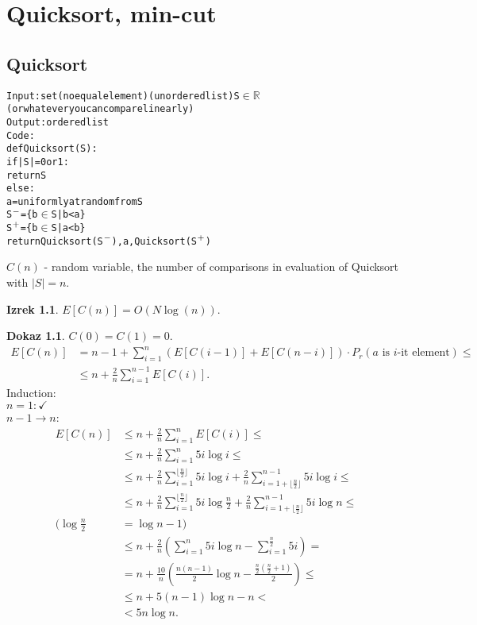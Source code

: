\documentclass[a4paper, 12pt]{book}
\theoremstyle{definition}
\newtheorem{theorem}[counter]{Izrek}
\newtheorem{pro}[counter]{Dokaz}
\theoremstyle{remark}
\newcommand{\R}{\mathbb{R}}
\begin{document}
\chapter{Quicksort, min-cut}


\section{Quicksort}

\begin{alltt}
  Input: set (no equal element) (unordered list) S\(\in\R\)
      (or whatever you can compare linearly)
  Output: ordered list
  Code:
    def Quicksort(S):
      if |S|= 0 or 1:
        return S
      else:
        a = uniformly at random from S
        S\(\sp{-}\) = \{b \(\in\) S | b < a\}
        S\(\sp{+}\) = \{b \(\in\) S | a < b\}
        return Quicksort(S\(\sp{-}\)), a, Quicksort(S\(\sp{+}\))
\end{alltt}
$C(n)$ - random variable, the number of comparisons in evaluation of Quicksort with $|S| = n$.
\begin{theorem}
  $E[C(n)] = O\left(N \log(n)\right)$.
\end{theorem}
\begin{pro}
  $C(0) = C(1) = 0$. \\
  \begin{align*}
    E[C(n)] &= n - 1 + \sum_{i=1}^{n} \left(E[C(i-1)] + E[C(n-i)]\right) \cdot P_r(a \text{ is $i$-it element}) \leq \\
    &\leq n + \frac{2}{n} \sum_{i=1}^{n-1} E[C(i)].
  \end{align*}
  Induction: \\
  $n = 1: \checkmark$ \\
  $n-1 \to n$:
  \begin{align*}
    E[C(n)] &\leq n + \frac{2}{n} \sum_{i=1}^{n} E[C(i)] \leq \\
    &\leq n + \frac{2}{n} \sum_{i=1}^{n} 5i \log i \leq \\
    &\leq n + \frac{2}{n} \sum_{i=1}^{\lfloor\frac{n}{2}\rfloor} 5i \log i +
      \frac{2}{n} \sum_{i=1+\lfloor\frac{n}{2}\rfloor}^{n-1} 5i \log i \leq \\
    &\leq n + \frac{2}{n} \sum_{i=1}^{\lfloor\frac{n}{2}\rfloor} 5i \log \frac{n}{2} +
      \frac{2}{n} \sum_{i=1+\lfloor\frac{n}{2}\rfloor}^{n-1} 5i \log n \leq \\
    (\log \frac{n}{2} &= \log n - 1) \\
    &\leq n + \frac{2}{n} \left(\sum_{i=1}^n 5i \log n - \sum_{i=1}^{\frac{n}{2}} 5i\right) = \\
    &= n + \frac{10}{n} \left(\frac{n(n-1)}{2} \log n - \frac{\frac{n}{2} (\frac{n}{2} + 1)}{2}\right) \leq \\
    &\leq n + 5(n-1) \log n - n < \\
    &< 5n \log n.
  \end{align*}
\end{pro}
\end{document}
